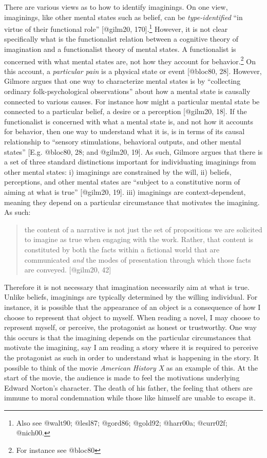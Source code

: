 \documentclass[
  letterpaper,
  DIV=11,
  numbers=noendperiod]{scrartcl}
\theoremstyle{remark}
\begin{document}
There are various views as to how to identify imaginings. On one view,
imaginings, like other mental states such as belief, can be
\emph{type-identified} ``in virtue of their functional role''
{[}@gilm20, 170{]}.\footnote{Also see @walt90; @lesl87; @gord86;
  @gold92; @harr00a; @curr02f; @nich00.} However, it is not clear
specifically what is the functionalist relation between a cognitive
theory of imagination and a functionalist theory of mental states. A
functionalist is concerned with what mental states are, not how they
account for behavior.\footnote{For instance see @bloc80} On this
account, a \emph{particular pain} is a physical state or event
{[}@bloc80, 28{]}. However, Gilmore argues that one way to characterize
mental states is by ``collecting ordinary folk-psychological
observations'' about how a mental state is causally connected to various
causes. For instance how might a particular mental state be connected to
a particular belief, a desire or a perception {[}@gilm20, 18{]}. If the
functionalist is concerned with what a mental state is, and not how it
accounts for behavior, then one way to understand what it is, is in
terms of its causal relationship to ``sensory stimulations, behavioral
outputs, and other mental states'' {[}E.g. @bloc80, 28; and @gilm20,
19{]}. As such, Gilmore argues that there is a set of three standard
distinctions important for individuating imaginings from other mental
states: i) imaginings are constrained by the will, ii) beliefs,
perceptions, and other mental states are ``subject to a constitutive
norm of aiming at what is true'' {[}@gilm20, 19{]}. iii) imaginings are
context-dependent, meaning they depend on a particular circumstance that
motivates the imagining. As such:

\begin{quote}
the content of a narrative is not just the set of propositions we are
solicited to imagine as true when engaging with the work. Rather, that
content is constituted by both the facts within a fictional world that
are communicated \emph{and} the modes of presentation through which
those facts are conveyed. {[}@gilm20, 42{]}
\end{quote}

Therefore it is not necessary that imagination necessarily aim at what
is true. Unlike beliefs, imaginings are typically determined by the
willing individual. For instance, it is possible that the appearance of
an object is a consequence of how I choose to represent that object to
myself. When reading a novel, I may choose to represent myself, or
perceive, the protagonist as honest or trustworthy. One way this occurs
is that the imagining depends on the particular circumstances that
motivate the imagining, say I am reading a story where it is required to
perceive the protagonist as such in order to understand what is
happening in the story. It possible to think of the movie \emph{American
History X} as an example of this. At the start of the movie, the
audience is made to feel the motivations underlying Edward Norton's
character. The death of his father, the feeling that others are immune
to moral condemnation while those like himself are unable to escape it.
\end{document}
